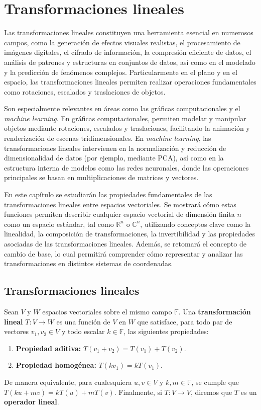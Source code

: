 \chapter{Transformaciones lineales}

Las transformaciones lineales constituyen una herramienta esencial en numerosos campos, como la generación de efectos visuales realistas, el procesamiento de imágenes digitales, el cifrado de información, la compresión eficiente de datos, el análisis de patrones y estructuras en conjuntos de datos, así como en el modelado y la predicción de fenómenos complejos. Particularmente en el plano y en el espacio, las transformaciones lineales permiten realizar operaciones fundamentales como rotaciones, escalados y traslaciones de objetos.

Son especialmente relevantes en áreas como las gráficas computacionales y el \textit{machine learning}. En gráficas computacionales, permiten modelar y manipular objetos mediante rotaciones, escalados y traslaciones, facilitando la animación y renderización de escenas tridimensionales. En \textit{machine learning}, las transformaciones lineales intervienen en la normalización y reducción de dimensionalidad de datos (por ejemplo, mediante PCA), así como en la estructura interna de modelos como las redes neuronales, donde las operaciones principales se basan en multiplicaciones de matrices y vectores.

En este capítulo se estudiarán las propiedades fundamentales de las transformaciones lineales entre espacios vectoriales. Se mostrará cómo estas funciones permiten describir cualquier espacio vectorial de dimensión finita $n$ como un espacio estándar, tal como $\mathbb{R}^n$ o $\mathbb{C}^n$, utilizando conceptos clave como la linealidad, la composición de transformaciones, la invertibilidad y las propiedades asociadas de las transformaciones lineales. Además, se retomará el concepto de cambio de base, lo cual permitirá comprender cómo representar y analizar las transformaciones en distintos sistemas de coordenadas.


\section{Transformaciones lineales}
\begin{definition} \label{defTL}
Sean $V$ y $W$ espacios vectoriales sobre el mismo campo $\mathbb{F}$. Una \textbf{transformación lineal} $T:V\rightarrow W$ es una función de $V$ en $W$ que satisface, para todo par de vectores $v_1, v_2 \in V$ y todo escalar $k \in \mathbb{F}$, las siguientes propiedades:
\begin{enumerate}[$1.$]
    \item \textbf{Propiedad aditiva:} $T(v_1 + v_2) = T(v_1) + T(v_2)$.
    \item \textbf{Propiedad homogénea:} $T(k v_1) = k T(v_1)$.
\end{enumerate}
De manera equivalente, para cualesquiera $u, v \in V$ y $k, m \in \mathbb{F}$, se cumple que $T(k u + m v) = k T(u) + m T(v)$. Finalmente, si $T:V\rightarrow V$, diremos que $T$ es un \textbf{operador lineal}.
\end{definition}


